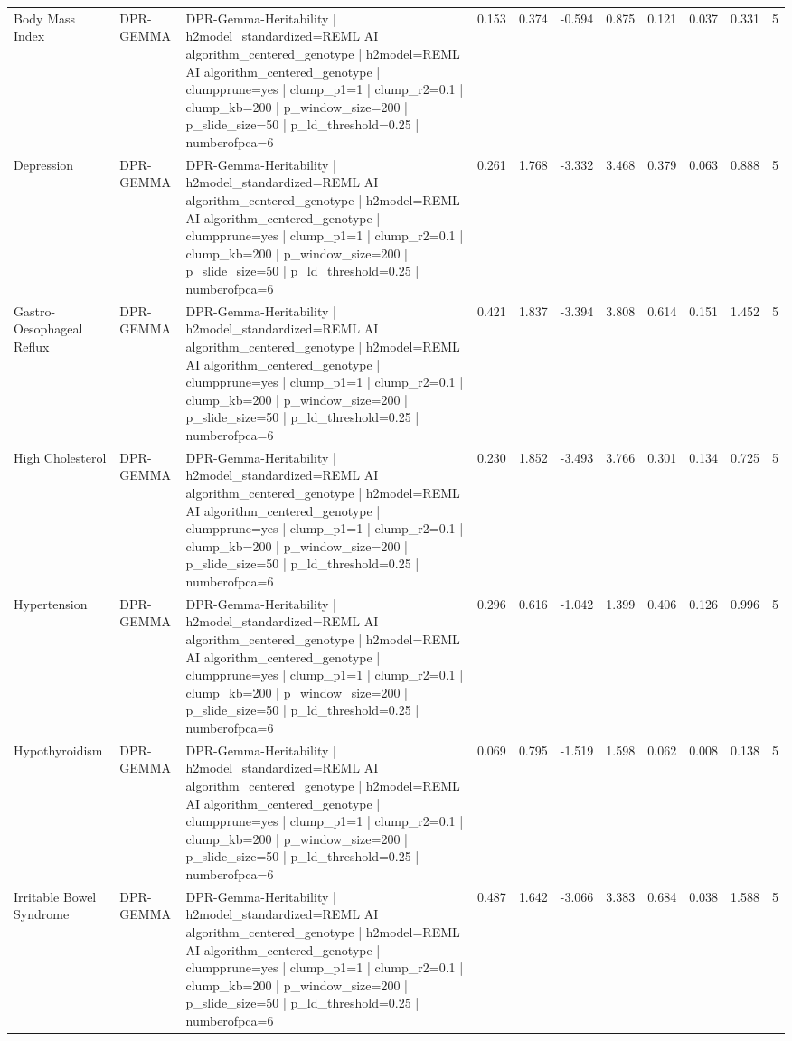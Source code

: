 \begin{landscape}
\begin{longtable}{p{2.4cm}p{1.8cm}p{6.0cm}rrrrrrrr}
Body Mass Index & DPR-GEMMA & DPR-Gemma-Heritability | h2model\_standardized=REML AI algorithm\_centered\_genotype | h2model=REML AI algorithm\_centered\_genotype | clumpprune=yes | clump\_p1=1 | clump\_r2=0.1 | clump\_kb=200 | p\_window\_size=200 | p\_slide\_size=50 | p\_ld\_threshold=0.25 | numberofpca=6 & 0.153 & 0.374 & -0.594 & 0.875 & 0.121 & 0.037 & 0.331 & 5 \\
Depression & DPR-GEMMA & DPR-Gemma-Heritability | h2model\_standardized=REML AI algorithm\_centered\_genotype | h2model=REML AI algorithm\_centered\_genotype | clumpprune=yes | clump\_p1=1 | clump\_r2=0.1 | clump\_kb=200 | p\_window\_size=200 | p\_slide\_size=50 | p\_ld\_threshold=0.25 | numberofpca=6 & 0.261 & 1.768 & -3.332 & 3.468 & 0.379 & 0.063 & 0.888 & 5 \\
Gastro-Oesophageal Reflux & DPR-GEMMA & DPR-Gemma-Heritability | h2model\_standardized=REML AI algorithm\_centered\_genotype | h2model=REML AI algorithm\_centered\_genotype | clumpprune=yes | clump\_p1=1 | clump\_r2=0.1 | clump\_kb=200 | p\_window\_size=200 | p\_slide\_size=50 | p\_ld\_threshold=0.25 | numberofpca=6 & 0.421 & 1.837 & -3.394 & 3.808 & 0.614 & 0.151 & 1.452 & 5 \\
High Cholesterol & DPR-GEMMA & DPR-Gemma-Heritability | h2model\_standardized=REML AI algorithm\_centered\_genotype | h2model=REML AI algorithm\_centered\_genotype | clumpprune=yes | clump\_p1=1 | clump\_r2=0.1 | clump\_kb=200 | p\_window\_size=200 | p\_slide\_size=50 | p\_ld\_threshold=0.25 | numberofpca=6 & 0.230 & 1.852 & -3.493 & 3.766 & 0.301 & 0.134 & 0.725 & 5 \\
Hypertension & DPR-GEMMA & DPR-Gemma-Heritability | h2model\_standardized=REML AI algorithm\_centered\_genotype | h2model=REML AI algorithm\_centered\_genotype | clumpprune=yes | clump\_p1=1 | clump\_r2=0.1 | clump\_kb=200 | p\_window\_size=200 | p\_slide\_size=50 | p\_ld\_threshold=0.25 | numberofpca=6 & 0.296 & 0.616 & -1.042 & 1.399 & 0.406 & 0.126 & 0.996 & 5 \\
Hypothyroidism & DPR-GEMMA & DPR-Gemma-Heritability | h2model\_standardized=REML AI algorithm\_centered\_genotype | h2model=REML AI algorithm\_centered\_genotype | clumpprune=yes | clump\_p1=1 | clump\_r2=0.1 | clump\_kb=200 | p\_window\_size=200 | p\_slide\_size=50 | p\_ld\_threshold=0.25 | numberofpca=6 & 0.069 & 0.795 & -1.519 & 1.598 & 0.062 & 0.008 & 0.138 & 5 \\
Irritable Bowel Syndrome & DPR-GEMMA & DPR-Gemma-Heritability | h2model\_standardized=REML AI algorithm\_centered\_genotype | h2model=REML AI algorithm\_centered\_genotype | clumpprune=yes | clump\_p1=1 | clump\_r2=0.1 | clump\_kb=200 | p\_window\_size=200 | p\_slide\_size=50 | p\_ld\_threshold=0.25 | numberofpca=6 & 0.487 & 1.642 & -3.066 & 3.383 & 0.684 & 0.038 & 1.588 & 5 \\

\end{longtable}
\end{landscape}
